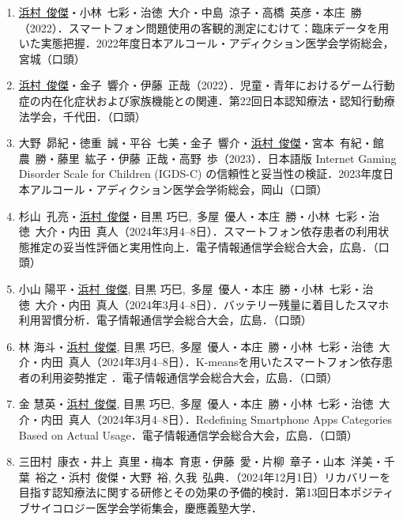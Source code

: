 \documentclass[11pt,a4paper]{article}
\begin{document}
\begin{enumerate}
	\item \underline{浜村\ 俊傑}・小林\ 七彩・治徳\ 大介・中島\ 涼子・高橋\ 英彦・本庄\ 勝（2022）．スマートフォン問題使用の客観的測定にむけて：臨床データを用いた実態把握．2022年度日本アルコール・アディクション医学会学術総会，宮城（口頭）
	\item \underline{浜村\ 俊傑}・金子\ 響介・伊藤\ 正哉（2022）．児童・青年におけるゲーム行動症の内在化症状および家族機能との関連．第22回日本認知療法・認知行動療法学会，千代田．（口頭）
	\item 大野\ 昴紀・徳重\ 誠・平谷\ 七美・金子\ 響介・\underline{浜村\ 俊傑}・宮本\ 有紀・館農\ 勝・藤里\ 紘子・伊藤\ 正哉・高野\ 歩（2023）．日本語版 Internet Gaming Disorder Scale for Children (IGDS-C) の信頼性と妥当性の検証．2023年度日本アルコール・アディクション医学会学術総会，岡山（口頭）
	\item 杉山\ 孔亮・\underline{浜村\ 俊傑}・目黒 巧巳,\ 多屋\ 優人・本庄\ 勝・小林\ 七彩・治徳\ 大介・内田\ 真人（2024年3月4--8日）．スマートフォン依存患者の利用状態推定の妥当性評価と実用性向上．電子情報通信学会総合大会，広島．（口頭）
	\item 小山 陽平・\underline{浜村\ 俊傑}, 目黒 巧巳,\ 多屋\ 優人・本庄\ 勝・小林\ 七彩・治徳\ 大介・内田\ 真人（2024年3月4--8日）．バッテリー残量に着目したスマホ利用習慣分析．電子情報通信学会総合大会，広島．（口頭）
	\item 林 海斗・\underline{浜村\ 俊傑}, 目黒 巧巳,\ 多屋\ 優人・本庄\ 勝・小林\ 七彩・治徳\ 大介・内田\ 真人（2024年3月4--8日）．K-meansを用いたスマートフォン依存患者の利用姿勢推定 ．電子情報通信学会総合大会，広島．（口頭）
	\item 金 慧英・\underline{浜村\ 俊傑}, 目黒 巧巳,\ 多屋\ 優人・本庄\ 勝・小林\ 七彩・治徳\ 大介・内田\ 真人（2024年3月4--8日）．Redefining Smartphone Apps Categories Based on Actual Usage．電子情報通信学会総合大会，広島．（口頭）
	\item 三田村\ 康衣・井上\ 真里・梅本\ 育恵・伊藤\ 愛・片柳\ 章子・山本\ 洋美・千葉\ 裕之・浜村\ 俊傑・大野\ 裕, 久我\ 弘典．（2024年12月1日）リカバリーを目指す認知療法に関する研修とその効果の予備的検討．第13回日本ポジティブサイコロジー医学会学術集会，慶應義塾大学．
	
\end{enumerate}
\end{document}
